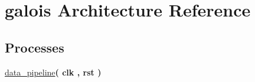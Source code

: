 \hypertarget{classlfsr__internal_1_1galois}{\section{galois Architecture Reference}
\label{classlfsr__internal_1_1galois}
}
\subsection*{Processes}
 \begin{DoxyCompactItemize}
\item 
\hypertarget{classlfsr__internal_1_1galois_ab0a54e92d710dc996e125e7c3c005889}{\hyperlink{classlfsr__internal_1_1galois_ab0a54e92d710dc996e125e7c3c005889}{data\-\_\-pipeline}{\bfseries  ( {\bfseries \textcolor{vhdlchar}{clk}\textcolor{vhdlchar}{ }\textcolor{vhdlchar}{ }\textcolor{vhdlchar}{ }} , {\bfseries \textcolor{vhdlchar}{rst}\textcolor{vhdlchar}{ }} )}}\label{classlfsr__internal_1_1galois_ab0a54e92d710dc996e125e7c3c005889}

\end{DoxyCompactItemize}
